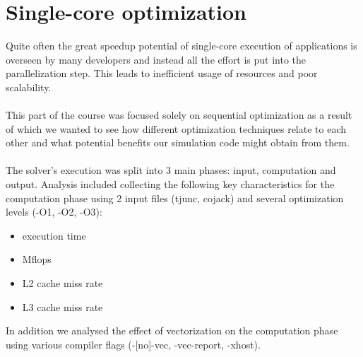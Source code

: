 \documentclass{article}
\begin{document}
\section{Single-core optimization}
Quite often the great speedup potential of single-core execution of applications is overseen by
many developers and instead all the effort is put into the parallelization step. This leads to
inefficient usage of resources and poor scalability.
\\\\
This part of the course was focused solely on sequential optimization as a result of which 
we wanted to see how different optimization techniques relate to each other and what potential 
benefits our simulation code might obtain from them.
\\\\
The solver's execution was split into 3 main phases: input, computation and output. Analysis 
included collecting the following key characteristics for the computation phase using 2 input 
files (tjunc, cojack) and several optimization levels (-O1, -O2, -O3):
\begin{itemize}
	\item execution time
	\item Mflops
	\item L2 cache miss rate
	\item L3 cache miss rate
\end{itemize}
In addition we analysed the effect of vectorization on the computation phase using various
compiler flags (-[no]-vec, -vec-report, -xhost).
\end{document}

